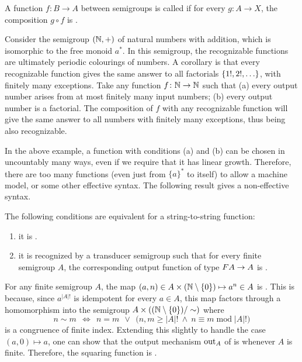 \AP A function $f\colon B \to A$ between semigroups
is called  if for every
 $g\colon A \to X$, the composition $g \circ f$ is
.

\begin{example}
  Consider the semigroup $({\mathbb N}, +)$ of natural numbers with addition, which is isomorphic to the free monoid $a^*$. In this semigroup, the recognizable functions are ultimately periodic colourings of numbers. A corollary is that every recognizable function gives the same answer to all factorials $\{1!,2!,\ldots\}$, with finitely many exceptions. Take any function $f\colon {\mathbb N} \to {\mathbb N}$ such that (a) every output number arises from at most finitely many input numbers; (b) every output number is a factorial. The composition of $f$ with any recognizable function will give the same answer to all numbers with finitely many exceptions, thus being also recognizable.
\end{example}

In the above example, a function with conditions (a) and (b) can be chosen in uncountably many ways, even if we require that it has linear growth.
Therefore, there are too many  functions (even
just from $\{a\}^*$ to itself) to
allow a machine model, or some other effective syntax. The following result
gives a non-effective syntax.

\begin{theorem}\label{thm:reco-reflecting-functions} The following conditions are equivalent for a string-to-string function:
 \begin{enumerate}
 \item \label{it:reco-refl} it is .
 \item \label{it:trans-semig-reco}it is recognized by a transducer semigroup such that for every finite semigroup $A$, the corresponding output function of type 
 $\functor A \to A$
 is .
 \end{enumerate}
\end{theorem}
\begin{example}\label{ex:squaring-reco-refl}
  For any finite semigroup $A$, the map $(a,n) \in A \times
  ({\mathbb N}\setminus\{0\}) \mapsto a^n \in A$ is . This is
  because, since $a^{|A|!}$ is idempotent for every $a\in A$, this map factors
  through a homomorphism into the semigroup $A \times
  (({\mathbb N}\setminus\{0\})/\sim)$ where
    \[ n \sim m ~~\iff~~ n = m ~~\lor~~ \big(n,m \geq |A|! ~\land~ n \equiv m \;\mathrm{mod}\; |A|!\big) \]
  is a congruence of finite index. Extending this slightly to handle the case $(a,0)\mapsto a$, one can show that the output mechanism $\mathrm{out}_A$ of  is  whenever $A$ is finite. Therefore, the squaring function is .
\end{example}
